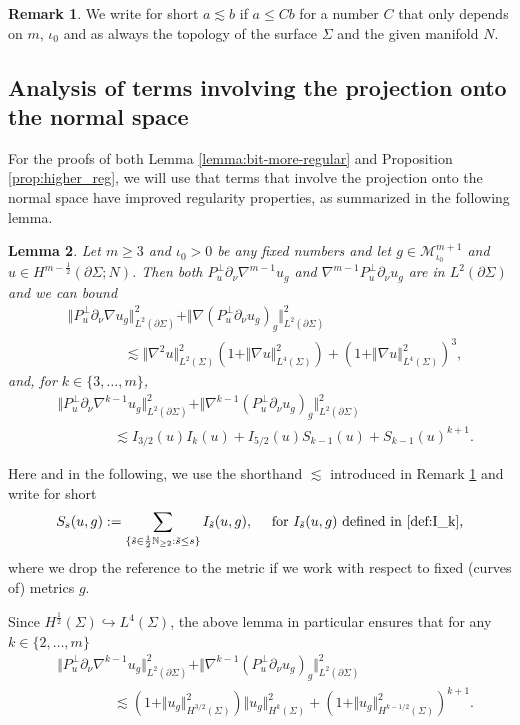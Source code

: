 \documentclass[10pt,reqno]{amsart}
\theoremstyle{plain}
\newtheorem{lemma}{Lemma}[section]
\theoremstyle{definition}
\newcommand{\pnu}{\partial_\nu}
\newtheorem{rmk}[lemma]{Remark}
\numberwithin{equation}{section}
\newcommand{\Si}{\Sigma}
\newcommand{\N}{\ensuremath{{\mathbb N}}}
\newcommand{\norm}[1]{\Vert#1\Vert}
\newcommand{\beqa}{\begin{equation}\begin{aligned}}
\newcommand{\eeqa}{\end{aligned}\end{equation}}
\newcommand{\half}{\frac{1}{2}}
\newcommand{\leqs}{\lesssim}
\newcommand{\na}{\nabla}
\newcommand{\MM}{\mathcal{M}} %
\newcommand{\hf}{\frac{1}{2}} %
\newcommand{\p}{\partial} %
\newcommand{\MMiota}{\MM_{\iota_0}}
\begin{document}
\begin{rmk}\label{rmk:less-sim}
    We write for short $a \leqs b$ if $a\leq Cb$ for a number $C$ that only depends on $m$, $\iota_0$ and as always the topology of the surface $\Si$ and the given manifold $N$. 
\end{rmk}



\subsection{Analysis of terms involving the projection 
onto the normal space}\label{subsect:normal-proj}
For the proofs of both Lemma \ref{lemma:bit-more-regular} and Proposition \ref{prop:higher_reg}, we will use that terms that involve the projection onto the normal space have improved regularity properties, as summarized in the following lemma. 

\begin{lemma}\label{lemma:orth-proj-lot}
    Let $m\geq 3$ and $\iota_0>0$ be any fixed numbers and let $g\in \MMiota^{m+1}$ and $u \in H^{m-\hf}(\p\Si;N)$. Then both $P_u^\perp\p_\nu \nabla^{m-1} u_g$ and $\nabla^{m-1} P_u^\perp\p_\nu u_g $ are in $L^2(\p\Si)$ and we can bound 
    \beqa\label{est:proj-improved-est-L2}
        &\norm{P_u^\perp\pnu \nabla u_{g}}_{L^2(\p\Si)}^2 + \norm{\nabla (P_u^\perp\pnu u_{g})_g}_{L^2(\p\Si)}^2\\
        & \qquad \qquad \leqs \norm{\nabla^2 u}_{L^2(\Si)}^2(1+\norm{\nabla u}_{L^4(\Si)}^2) + (1+\norm{\nabla u}_{L^4(\Si)}^2)^3,
    \eeqa
    and, for $k\in \{3,\ldots,m\}$, 
    \beqa\label{est:proj-improved-est-Hk}
        &\norm{P_u^\perp\pnu \nabla^{k-1} u_{g}}_{L^2(\p\Si)}^2+ \norm{\na^{k-1}(P_u^\perp\pnu u_{g})_g}_{L^2(\p\Si)}^2\\
        & \qquad \qquad \leqs I_{3/2}(u) I_{k}(u)+I_{5/2}(u) S_{k-1}(u) + S_{k-1}(u)^{k+1}.
    \eeqa
\end{lemma}


Here and in the following, we use the shorthand $\leqs$ introduced in Remark \ref{rmk:less-sim} and write for short 
\begin{align}\label{def:S_k} 
    S_s(u,g) :=\sum_{\{\tilde{s} \in \hf \N_{\geq 2}: \tilde s\leq s\}} I_{\tilde{s}}(u,g), \quad \text{ for }I_{\tilde s}(u,g) \text{ defined in \eqref{def:I_k},}
\end{align}
where we drop the reference to the metric if we work with respect to fixed (curves of) metrics $g$.


Since $H^{\half}(\Si)\hookrightarrow L^4(\Si)$, the above lemma in particular ensures that for any $k\in \{2,\ldots, m\}$
\beqa\label{est:proj-improved-est-all-k}
    & \norm{P_u^\perp\pnu \nabla^{k-1} u_{g}}_{L^2(\p\Si)}^2+ \norm{\na^{k-1} (P_u^\perp\pnu u_{g})_g}_{L^2(\p\Si)}^2\\
    &\qquad \qquad \leqs (1+\norm{u_g}_{H^{3/2}(\Si)}^2)\norm{u_g}_{H^k(\Si)}^2 + (1+\norm{u_g}_{H^{k-1/2}(\Si)}^2)^{k+1}.
\eeqa 
\end{document}
